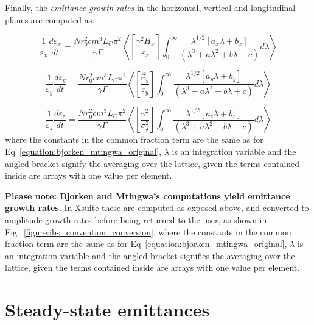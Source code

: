 Finally, the \textit{emittance growth rates} in the horizontal, vertical and longitudinal planes are computed as:

\begin{equation}
    \boxed{\frac{1}{\varepsilon_x} \frac{d \varepsilon_x}{dt} = \frac{N r_0^{2} c m^3 L_C \pi^2}{\gamma \Gamma} \left< \left[\frac{\gamma^2 H_x}{\varepsilon_x}\right] \int_0^{\infty} \frac{\lambda^{1/2} \left[a_x \lambda + b_x\right]}{\left(\lambda^3 + a \lambda^2 + b \lambda + c\right)} d \lambda \right>}
    \label{equation:bm_tx}
\end{equation}

\begin{equation}
    \boxed{\frac{1}{\varepsilon_y} \frac{d \varepsilon_y}{dt} = \frac{N r_0^{2} c m^3 L_C \pi^2}{\gamma \Gamma} \left< \left[\frac{\beta_y}{\varepsilon_y}\right] \int_0^{\infty} \frac{\lambda^{1/2} \left[a_y \lambda + b_y\right]}{\left(\lambda^3 + a \lambda^2 + b \lambda + c\right)} d \lambda \right>}
    \label{equation:bm_ty}
\end{equation}

\begin{equation}
    \boxed{\frac{1}{\varepsilon_z} \frac{d \varepsilon_z}{dt} = \frac{N r_0^{2} c m^3 L_C \pi^2}{\gamma \Gamma} \left< \left[\frac{\gamma^2}{\sigma_{\delta}^{2}}\right] \int_0^{\infty} \frac{\lambda^{1/2} \left[a_z \lambda + b_z\right]}{\left(\lambda^3 + a \lambda^2 + b \lambda + c\right)} d \lambda \right>}
    \label{equation:bm_tz}
\end{equation}
where the constants in the common fraction term are the same as for Eq~\eqref{equation:bjorken_mtingwa_original}, \(\lambda\) is an integration variable and the angled bracket signify the averaging over the lattice, given the terms contained inside are arrays with one value per element.
\newline

\textbf{Please note: Bjorken and Mtingwa's computations yield emittance growth rates}.
In Xsuite these are computed as exposed above, and converted to amplitude growth rates before being returned to the user, as shown in Fig.~\ref{figure:ibs_convention_conversion}.
where the constants in the common fraction term are the same as for Eq~\eqref{equation:bjorken_mtingwa_original}, \(\lambda\) is an integration variable and the angled bracket signifies the averaging over the lattice, given the terms contained inside are arrays with one value per element.

\section{Steady-state emittances}
\label{subsection:steady-state_emittances}

